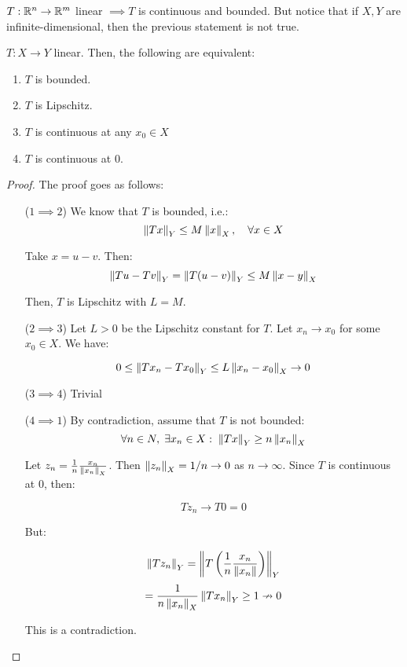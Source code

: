 \vspace{1em}

\begin{fremark}
    $T: \mathbb{R}^n \to \mathbb{R}^m$ linear $\implies T$ is continuous and bounded.
    But notice that if $X, Y$ are infinite-dimensional, then the 
    previous statement is not true.
\end{fremark}

\begin{ftheorem}
    $T: X \to Y$ linear. Then, the following are equivalent:
    \vspace{1em}
    \begin{enumerate}[label=\arabic*)]
        \item $T$ is bounded. 
        \vspace{1em}
        \item $T$ is Lipschitz.
        \vspace{1em}
        \item $T$ is continuous at any $x_0 \in X$
        \vspace{1em}
        \item $T$ is continuous at $0$.
    \end{enumerate}
\end{ftheorem}

\begin{proof}
    The proof goes as follows:

    \begin{enumerate}
        \item[($1 \implies 2$)] We know that $T$ is bounded, i.e.:
        $$\left\|Tx\right\|_Y \leq M \left\|x\right\|_X, \quad \forall x \in X$$

        Take $x = u - v$. Then:
        $$\left\|Tu - Tv\right\|_Y = \left\|T(u - v)\right\|_Y \leq M \left\|x-y\right\|_X$$

        Then, $T$ is Lipschitz with $L = M$.

        \item[($2 \implies 3$)] Let $L > 0$ be the Lipschitz constant for $T$. Let $x_n \to x_0$
        for some $x_0 \in X$. We have:

        $$0 \leq \left\|Tx_n - Tx_0\right\|_Y \leq L \left\|x_n - x_0\right\|_X \to 0$$

        \item[($3 \implies 4$)] Trivial
        
        \item[($4 \implies 1$)] By contradiction, assume that $T$ is not bounded:
        $$\forall n \in N, \; \exists x_n \in X: \; \left\|Tx\right\|_Y \geq n \left\|x_n\right\|_X$$

        Let $z_n = \frac{1}{n} \frac{x_n}{\left\|x_n\right\|_X}$. Then $\left\|z_n\right\|_X = 1/n \to 0$ as $n \to \infty$.
        Since $T$ is continuous at $0$, then:

        $$Tz_n \to T 0 = 0$$

        But:

        $$\left\|Tz_n\right\|_Y = \left\|T\left(\frac{1}{n} \frac{x_n}{\left\|x_n\right\|}\right)\right\|_Y$$
        $$= \frac{1}{n \left\|x_n\right\|_X} \left\|T x_n\right\|_Y \geq 1 \nrightarrow 0$$

        This is a contradiction.
    \end{enumerate}
\end{proof}

